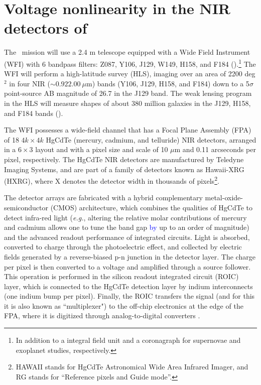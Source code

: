 \documentclass[preprint]{aastex}
\begin{document}
\section{Voltage nonlinearity in the NIR detectors of \wfa}
\label{section:NL}

The \wfa\ mission will use a 2.4 m telescope equipped with a Wide Field Instrument (WFI) with 6 bandpass filters: Z087, Y106, J129, W149, H158, and F184 (\citealt{spergel15}).\footnote{In addition to a integral field unit and a coronagraph for supernovae and exoplanet studies, respectively.} The WFI will perform a high-latitude survey (HLS), imaging over an area of 2200 deg$^2$ in four NIR ($\sim0.92$\textendash $2.00\ \mu$m) bands (Y106, J129, H158, and F184) down to a 5$\sigma$ point-source AB magnitude of 26.7 in the J129 band. The weak lensing program in the HLS will measure shapes of about 380 million galaxies in the J129, H158, and F184 bands (\citealt{spergel15}). 

The WFI possesses a wide-field channel that has a Focal Plane Assembly (FPA) of 18 $4 k\times 4k$ HgCdTe (mercury, cadmium, and telluride) NIR detectors, arranged in a $6\times3$ layout and with a pixel size and scale of 10 $\mu$m and 0.11 arcseconds per pixel, respectively. The HgCdTe NIR detectors are manufactured by Teledyne Imaging Systems, and are part of a family of detectors known as Hawaii-XRG (HXRG), where X denotes the detector width in thousands of pixels\footnote{HAWAII stands for HgCdTe Astronomical Wide Area Infrared Imager, and RG stands for ``Reference pixels and Guide mode''.}. 

The detector arrays are fabricated with a hybrid complementary metal-oxide-semiconductor (CMOS) architecture, which combines the qualities of HgCdTe to detect infra-red light (\emph{e.g.}, altering the relative molar contributions of mercury and cadmium allows one to tune the band gap \textcolor{blue}{by} up to an order of magnitude) and the advanced readout performance of integrated circuits. Light is absorbed, converted to charge through the photoelectric effect, and collected by electric fields generated by a reverse-biased p-n junction in the detector layer.  The charge per pixel is then converted to a voltage and amplified through a source follower. This operation is performed in the silicon readout integrated circuit (ROIC) layer, which is connected to the HgCdTe detection layer by indium interconnects (one indium bump per pixel). Finally, the ROIC transfers the signal (and for this it is also known as ``multiplexer") to the off-chip electronics at the edge of the FPA, where it is digitized through analog-to-digital converters \citep{beletic08}.
\end{document}
